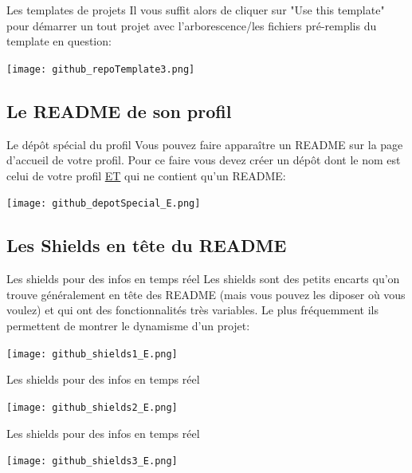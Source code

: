 \documentclass{beamer}
\begin{document}
\begin{frame}{Les templates de projets}
Il vous suffit alors de cliquer sur "Use this template" pour démarrer un tout projet avec l'arborescence/les fichiers pré-remplis du template en question:
\begin{center}
	\texttt{[image: github\_repoTemplate3.png]}
\end{center}
\end{frame}


\subsection{Le README de son profil}
\begin{frame}{Le dépôt spécial du profil}
Vous pouvez faire apparaître un README sur la page d'accueil de votre profil. Pour ce faire vous devez créer un dépôt dont le nom est celui de votre profil \underline{ET} qui ne contient qu'un README:
\begin{center}
	\texttt{[image: github\_depotSpecial\_E.png]}
\end{center}
\end{frame}


\subsection{Les Shields en tête du README}
\begin{frame}{Les shields pour des infos en temps réel}
Les shields sont des petits encarts qu'on trouve généralement en tête des README (mais vous pouvez les diposer où vous voulez) et qui ont des fonctionnalités très variables. Le plus fréquemment ils permettent de montrer le dynamisme d'un projet:
\begin{center}
	\texttt{[image: github\_shields1\_E.png]}
\end{center}
\end{frame}

\begin{frame}{Les shields pour des infos en temps réel}
\begin{center}
	\texttt{[image: github\_shields2\_E.png]}
\end{center}
\end{frame}

\begin{frame}{Les shields pour des infos en temps réel}
\begin{center}
	\texttt{[image: github\_shields3\_E.png]}
\end{center}
\end{frame}
\end{document}
